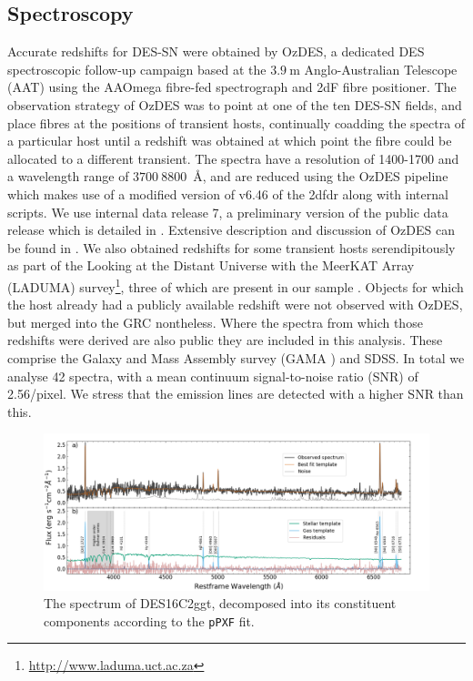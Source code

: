 \documentclass[fleqn,usenatbib,]{mnras}
\newcommand{\replychris}[1]{\color{magenta}#1 \color{black}}
\begin{document}
\subsection{Spectroscopy \label{subsec:spec}}
Accurate redshifts for DES-SN were obtained by OzDES, a dedicated DES spectroscopic follow-up campaign based at the $3.9~\textrm{m}$ Anglo-Australian Telescope (AAT) using the AAOmega fibre-fed spectrograph and 2dF fibre positioner. The observation strategy of OzDES was to point at one of the ten DES-SN fields, and place fibres at the positions of transient hosts, continually coadding the spectra of a particular host until a redshift was obtained at which point the fibre could be allocated to a different transient. The spectra have a resolution of 1400-1700 and a wavelength range of $3700~8800$~\AA, and are reduced using the OzDES pipeline which makes use of a modified version of v6.46 of the 2dfdr \citep{Croom2004} along with internal scripts. \replychris{We use internal data release 7, a preliminary version of the public data release which is detailed in \citet{Lidman2020}.} Extensive description and discussion of OzDES can be found in \citet{Yuan2015,Childress2017,Lidman2020}. \replychris{We also obtained redshifts for some transient hosts serendipitously as part of the Looking at the Distant Universe with the MeerKAT Array (LADUMA) survey\footnote{\url{http://www.laduma.uct.ac.za}}, three of which are present in our sample} .
Objects for which the host already had a publicly available redshift were not observed with OzDES, but merged into the GRC nontheless.  Where the spectra from which those redshifts were derived are also public they are included in this analysis. These comprise the Galaxy and Mass Assembly survey (GAMA \citealt{Driver2009,Baldry2018}) and SDSS. In total we analyse 42 spectra, with a mean continuum signal-to-noise ratio (SNR) of 2.56/pixel. We stress that the emission lines are detected with a higher SNR than this.

\begin{figure}
\includegraphics[width=\textwidth]{figs/gal_spec.png}
\caption{The spectrum of DES16C2ggt, decomposed into its constituent components according to the \texttt{pPXF} fit. 
\label{fig:host_spec}}
\end{figure}
\end{document}
